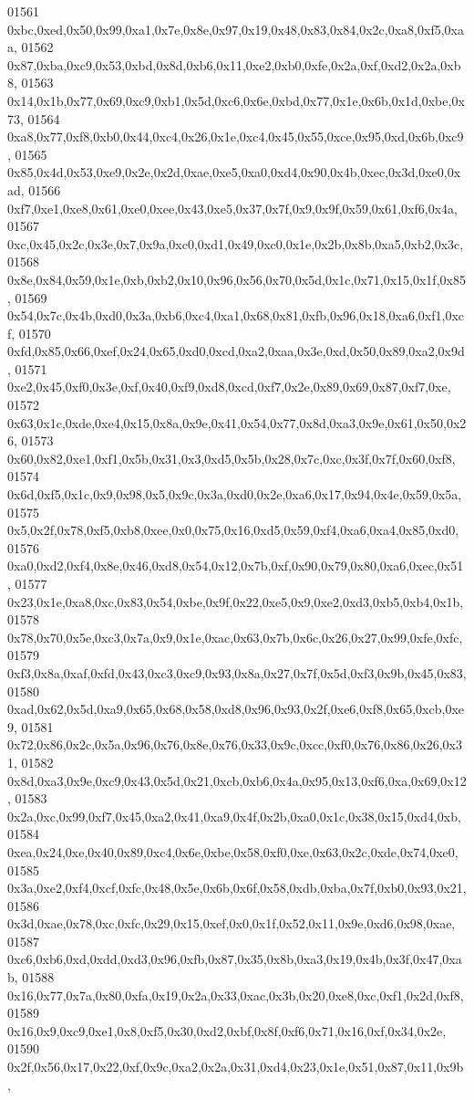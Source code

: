 \begin{DoxyCode}
01561   0xbc,0xed,0x50,0x99,0xa1,0x7e,0x8e,0x97,0x19,0x48,0x83,0x84,0x2c,0xa8,0xf5,0xaa,
01562   0x87,0xba,0xc9,0x53,0xbd,0x8d,0xb6,0x11,0xe2,0xb0,0xfe,0x2a,0xf,0xd2,0x2a,0xb8,
01563   0x14,0x1b,0x77,0x69,0xc9,0xb1,0x5d,0xc6,0x6e,0xbd,0x77,0x1e,0x6b,0x1d,0xbe,0x73,
01564   0xa8,0x77,0xf8,0xb0,0x44,0xc4,0x26,0x1e,0xc4,0x45,0x55,0xce,0x95,0xd,0x6b,0xc9,
01565   0x85,0x4d,0x53,0xe9,0x2e,0x2d,0xae,0xe5,0xa0,0xd4,0x90,0x4b,0xec,0x3d,0xe0,0xad,
01566   0xf7,0xe1,0xe8,0x61,0xe0,0xee,0x43,0xe5,0x37,0x7f,0x9,0x9f,0x59,0x61,0xf6,0x4a,
01567   0xc,0x45,0x2c,0x3e,0x7,0x9a,0xc0,0xd1,0x49,0xc0,0x1e,0x2b,0x8b,0xa5,0xb2,0x3c,
01568   0x8e,0x84,0x59,0x1e,0xb,0xb2,0x10,0x96,0x56,0x70,0x5d,0x1c,0x71,0x15,0x1f,0x85,
01569   0x54,0x7c,0x4b,0xd0,0x3a,0xb6,0xc4,0xa1,0x68,0x81,0xfb,0x96,0x18,0xa6,0xf1,0xcf,
01570   0xfd,0x85,0x66,0xef,0x24,0x65,0xd0,0xcd,0xa2,0xaa,0x3e,0xd,0x50,0x89,0xa2,0x9d,
01571   0xe2,0x45,0xf0,0x3e,0xf,0x40,0xf9,0xd8,0xcd,0xf7,0x2e,0x89,0x69,0x87,0xf7,0xe,
01572   0x63,0x1c,0xde,0xe4,0x15,0x8a,0x9e,0x41,0x54,0x77,0x8d,0xa3,0x9e,0x61,0x50,0x26,
01573   0x60,0x82,0xe1,0xf1,0x5b,0x31,0x3,0xd5,0x5b,0x28,0x7c,0xc,0x3f,0x7f,0x60,0xf8,
01574   0x6d,0xf5,0x1c,0x9,0x98,0x5,0x9c,0x3a,0xd0,0x2e,0xa6,0x17,0x94,0x4e,0x59,0x5a,
01575   0x5,0x2f,0x78,0xf5,0xb8,0xee,0x0,0x75,0x16,0xd5,0x59,0xf4,0xa6,0xa4,0x85,0xd0,
01576   0xa0,0xd2,0xf4,0x8e,0x46,0xd8,0x54,0x12,0x7b,0xf,0x90,0x79,0x80,0xa6,0xec,0x51,
01577   0x23,0x1e,0xa8,0xc,0x83,0x54,0xbe,0x9f,0x22,0xe5,0x9,0xe2,0xd3,0xb5,0xb4,0x1b,
01578   0x78,0x70,0x5e,0xc3,0x7a,0x9,0x1e,0xac,0x63,0x7b,0x6c,0x26,0x27,0x99,0xfe,0xfc,
01579   0xf3,0x8a,0xaf,0xfd,0x43,0xc3,0xc9,0x93,0x8a,0x27,0x7f,0x5d,0xf3,0x9b,0x45,0x83,
01580   0xad,0x62,0x5d,0xa9,0x65,0x68,0x58,0xd8,0x96,0x93,0x2f,0xe6,0xf8,0x65,0xcb,0xe9,
01581   0x72,0x86,0x2c,0x5a,0x96,0x76,0x8e,0x76,0x33,0x9c,0xcc,0xf0,0x76,0x86,0x26,0x31,
01582   0x8d,0xa3,0x9e,0xc9,0x43,0x5d,0x21,0xcb,0xb6,0x4a,0x95,0x13,0xf6,0xa,0x69,0x12,
01583   0x2a,0xc,0x99,0xf7,0x45,0xa2,0x41,0xa9,0x4f,0x2b,0xa0,0x1c,0x38,0x15,0xd4,0xb,
01584   0xea,0x24,0xe,0x40,0x89,0xc4,0x6e,0xbe,0x58,0xf0,0xe,0x63,0x2c,0xde,0x74,0xe0,
01585   0x3a,0xe2,0xf4,0xcf,0xfc,0x48,0x5e,0x6b,0x6f,0x58,0xdb,0xba,0x7f,0xb0,0x93,0x21,
01586   0x3d,0xae,0x78,0xc,0xfc,0x29,0x15,0xef,0x0,0x1f,0x52,0x11,0x9e,0xd6,0x98,0xae,
01587   0xc6,0xb6,0xd,0xdd,0xd3,0x96,0xfb,0x87,0x35,0x8b,0xa3,0x19,0x4b,0x3f,0x47,0xab,
01588   0x16,0x77,0x7a,0x80,0xfa,0x19,0x2a,0x33,0xac,0x3b,0x20,0xe8,0xc,0xf1,0x2d,0xf8,
01589   0x16,0x9,0xc9,0xe1,0x8,0xf5,0x30,0xd2,0xbf,0x8f,0xf6,0x71,0x16,0xf,0x34,0x2e,
01590   0x2f,0x56,0x17,0x22,0xf,0x9c,0xa2,0x2a,0x31,0xd4,0x23,0x1e,0x51,0x87,0x11,0x9b,

\end{DoxyCode}
